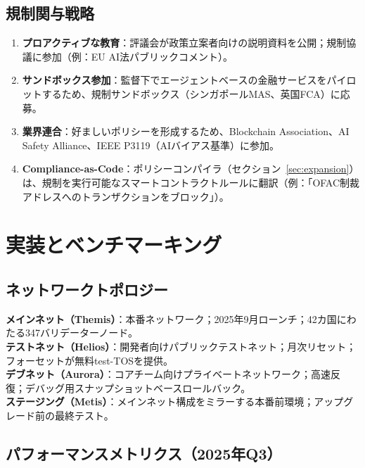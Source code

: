 \documentclass[11pt]{article}
\begin{document}
\subsection{規制関与戦略}

\begin{enumerate}[noitemsep]
  \item \textbf{プロアクティブな教育}：評議会が政策立案者向けの説明資料を公開；規制協議に参加（例：EU AI法パブリックコメント）。
  \item \textbf{サンドボックス参加}：監督下でエージェントベースの金融サービスをパイロットするため、規制サンドボックス（シンガポールMAS、英国FCA）に応募。
  \item \textbf{業界連合}：好ましいポリシーを形成するため、Blockchain Association、AI Safety Alliance、IEEE P3119（AIバイアス基準）に参加。
  \item \textbf{Compliance-as-Code}：ポリシーコンパイラ（セクション~\ref{sec:expansion}）は、規制を実行可能なスマートコントラクトルールに翻訳（例：「OFAC制裁アドレスへのトランザクションをブロック」）。
\end{enumerate}

\section{実装とベンチマーキング}
\label{sec:implementation}

\subsection{ネットワークトポロジー}

\textbf{メインネット（Themis）}：本番ネットワーク；2025年9月ローンチ；42カ国にわたる347バリデーターノード。\\
\textbf{テストネット（Helios）}：開発者向けパブリックテストネット；月次リセット；フォーセットが無料test-TOSを提供。\\
\textbf{デブネット（Aurora）}：コアチーム向けプライベートネットワーク；高速反復；デバッグ用スナップショットベースロールバック。\\
\textbf{ステージング（Metis）}：メインネット構成をミラーする本番前環境；アップグレード前の最終テスト。

\subsection{パフォーマンスメトリクス（2025年Q3）}
\end{document}
